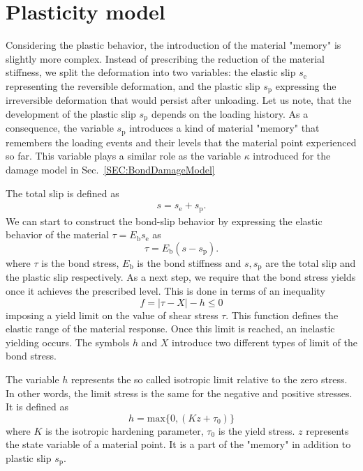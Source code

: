 \documentclass[main.tex]{subfiles}
\begin{document}
%

\section{Plasticity model}
\label{SEC:BondPlasticityModel}

Considering the plastic behavior, the introduction of the material "memory" is slightly more complex.
Instead of prescribing the reduction of the material stiffness, we split 
the deformation into two variables: the elastic slip $s_\mathrm{e}$ representing the reversible
deformation, and the plastic slip $s_\mathrm{p}$ expressing the irreversible deformation 
that would persist after unloading. Let us note, that the development of the plastic slip 
$s_\mathrm{p}$ depends on the loading history. As a consequence, the variable $s_\mathrm{p}$ 
introduces a kind of material "memory" that remembers the loading events and their levels that 
the material point experienced so far. This variable plays a similar role as the 
variable $\kappa$ introduced for the damage model in Sec.~\ref{SEC:BondDamageModel}

The total slip is defined as
\begin{align}
s = s_\mathrm{e} + s_\mathrm{p}.
\end{align}
We can start to construct the bond-slip behavior by expressing the elastic behavior of the material 
$\tau = E_\mathrm{b} s_\mathrm{e}$ as 
\begin{equation}
\tau = E_\mathrm{b} (s - s_\mathrm{p}).
\end{equation}
where $\tau$ is the bond stress, $E_\mathrm{b}$ is the bond stiffness and $s, s_\mathrm{p}$ are the total slip and the plastic slip respectively. 
As a next step, we require that the bond stress yields once it achieves the prescribed level. 
This is done in terms of an inequality 
\begin{equation}
\label{eq:yield_limit}
f = |\tau - X| - h \leq 0
\end{equation}
imposing a yield limit on the value of shear stress  $\tau$. This function defines the elastic range of the 
material response. Once this limit is reached, an inelastic yielding occurs. 
The symbols $h$ and $X$ introduce two different types of limit of the bond stress.

The variable $h$ represents the so called isotropic limit relative to the zero stress. In other words,
the limit stress is the same for the negative and positive stresses. It is defined as
\begin{equation}
h = \mathrm{max}\{0 , (K z + \tau_0)\}
\end{equation}
where $K$ is the isotropic hardening parameter, $\tau_0$ is the yield stress. $z$ represents the state 
variable of a material point. It is a part of the "memory" in addition to plastic slip $s_\mathrm{p}$. 
\end{document}
